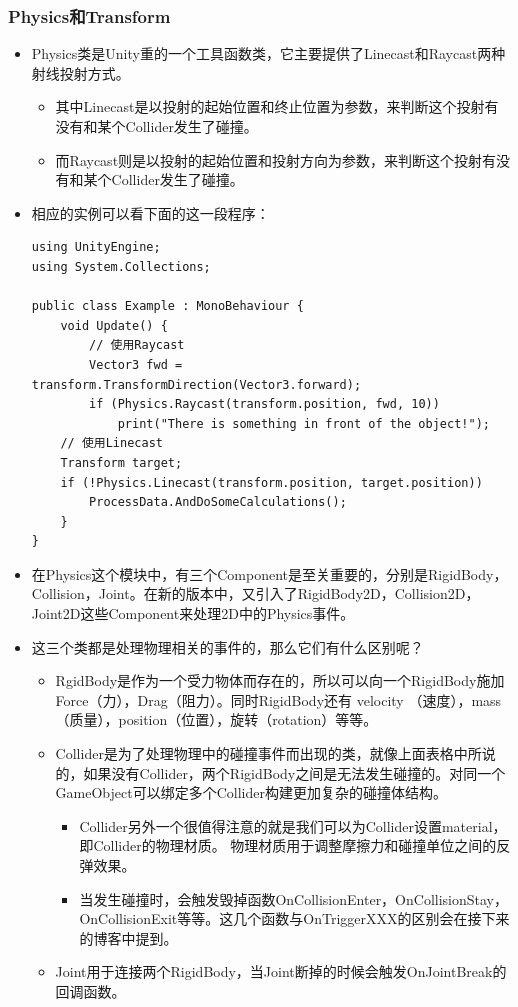 \documentclass[9pt, b5paper]{article}
\begin{document}
\subsubsection{Physics和Transform}
\label{sec:org5c37cbd}
\begin{itemize}
\item Physics类是Unity重的一个工具函数类，它主要提供了Linecast和Raycast两种射线投射方式。
\begin{itemize}
\item 其中Linecast是以投射的起始位置和终止位置为参数，来判断这个投射有没有和某个Collider发生了碰撞。
\item 而Raycast则是以投射的起始位置和投射方向为参数，来判断这个投射有没有和某个Collider发生了碰撞。
\end{itemize}
\item 相应的实例可以看下面的这一段程序：
\begin{verbatim}
using UnityEngine;
using System.Collections;

public class Example : MonoBehaviour {
    void Update() {
        // 使用Raycast
        Vector3 fwd = transform.TransformDirection(Vector3.forward);
        if (Physics.Raycast(transform.position, fwd, 10))
            print("There is something in front of the object!");
    // 使用Linecast
    Transform target;
    if (!Physics.Linecast(transform.position, target.position))
        ProcessData.AndDoSomeCalculations();
    }
}
\end{verbatim}
\item 在Physics这个模块中，有三个Component是至关重要的，分别是RigidBody，Collision，Joint。在新的版本中，又引入了RigidBody2D，Collision2D，Joint2D这些Component来处理2D中的Physics事件。
\item 这三个类都是处理物理相关的事件的，那么它们有什么区别呢？
\begin{itemize}
\item RgidBody是作为一个受力物体而存在的，所以可以向一个RigidBody施加Force（力），Drag（阻力）。同时RigidBody还有 velocity （速度），mass（质量），position（位置），旋转（rotation）等等。
\item Collider是为了处理物理中的碰撞事件而出现的类，就像上面表格中所说的，如果没有Collider，两个RigidBody之间是无法发生碰撞的。对同一个GameObject可以绑定多个Collider构建更加复杂的碰撞体结构。
\begin{itemize}
\item Collider另外一个很值得注意的就是我们可以为Collider设置material，即Collider的物理材质。 物理材质用于调整摩擦力和碰撞单位之间的反弹效果。
\item 当发生碰撞时，会触发毁掉函数OnCollisionEnter，OnCollisionStay，OnCollisionExit等等。这几个函数与OnTriggerXXX的区别会在接下来的博客中提到。
\end{itemize}
\item Joint用于连接两个RigidBody，当Joint断掉的时候会触发OnJointBreak的回调函数。
\end{itemize}
\end{itemize}
\end{document}
